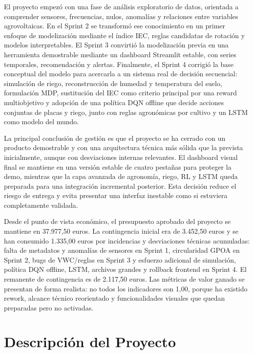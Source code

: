 \documentclass[11pt,a4paper]{article}
\begin{document}
El proyecto empezó con una fase de análisis exploratorio de datos, orientada a comprender sensores, frecuencias, nulos, anomalías y relaciones entre variables agrovoltaicas. En el Sprint 2 se transformó ese conocimiento en un primer enfoque de modelización mediante el índice IEC, reglas candidatas de rotación y modelos interpretables. El Sprint 3 convirtió la modelización previa en una herramienta demostrable mediante un dashboard Streamlit estable, con series temporales, recomendación y alertas. Finalmente, el Sprint 4 corrigió la base conceptual del modelo para acercarla a un sistema real de decisión secuencial: simulación de riego, reconstrucción de humedad y temperatura del suelo, formulación MDP, sustitución del IEC como criterio principal por una reward multiobjetivo y adopción de una política DQN offline que decide acciones conjuntas de placas y riego, junto con reglas agronómicas por cultivo y un LSTM como modelo del mundo.

La principal conclusión de gestión es que el proyecto se ha cerrado con un producto demostrable y con una arquitectura técnica más sólida que la prevista inicialmente, aunque con desviaciones internas relevantes. El dashboard visual final se mantiene en una versión estable de cuatro pestañas para proteger la demo, mientras que la capa avanzada de agronomía, riego, RL y LSTM queda preparada para una integración incremental posterior. Esta decisión reduce el riesgo de entrega y evita presentar una interfaz inestable como si estuviera completamente validada.

Desde el punto de vista económico, el presupuesto aprobado del proyecto se mantiene en 37.977,50 euros. La contingencia inicial era de 3.452,50 euros y se han consumido 1.335,00 euros por incidencias y desviaciones técnicas acumuladas: falta de metadatos y anomalías de sensores en Sprint 1, circularidad GPOA en Sprint 2, bugs de VWC/reglas en Sprint 3 y esfuerzo adicional de simulación, política DQN offline, LSTM, archivos grandes y rollback frontend en Sprint 4. El remanente de contingencia es de 2.117,50 euros. Las métricas de valor ganado se presentan de forma realista: no todos los indicadores son 1,00, porque ha existido rework, alcance técnico reorientado y funcionalidades visuales que quedan preparadas pero no activadas.

\newpage

\section{Descripción del Proyecto}
\end{document}
